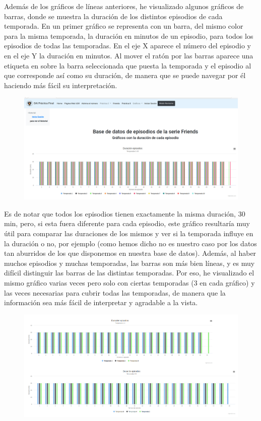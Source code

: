 \documentclass[12pt]{article}
\begin{document}
 Además de los gráficos de líneas anteriores, he visualizado algunos gráficos de barras, donde se muestra la duración de los distintos episodios de cada temporada. En un primer gráfico se representa con un barra, del mismo color para la misma temporada, la duración en minutos de un episodio, para todos los episodios de todas las temporadas. En el eje X aparece el número del episodio y en el eje Y la duración en minutos. Al mover el ratón por las barras aparece una etiqueta en sobre la barra seleccionada que puesta la temporada y el episodio al que corresponde así como su duración, de manera que se puede navegar por él haciendo más fácil su interpretación. 
 \begin{figure}[H]
 	\centering
 	\includegraphics[width=1.1\linewidth]{captura3}
 	\caption{}
 	\label{fig:captura3}
 \end{figure}
 
 Es de notar que todos los episodios tienen exactamente la misma duración, 30 min, pero, si esta fuera diferente para cada episodio, este gráfico resultaría muy útil para comparar las duraciones de los mismos y ver si la temporada influye en la duración o no, por ejemplo (como hemos dicho no es nuestro caso por los datos tan aburridos de los que disponemos en nuestra base de datos). Además, al haber muchos episodios y muchas temporadas, las barras son más bien líneas, y es muy difícil distinguir las barras de las distintas temporadas. Por eso, he visualizado el mismo gráfico varias veces pero solo con ciertas temporadas (3 en cada gráfico) y las veces necesarias para cubrir todas las temporadas, de manera que la información sea más fácil de interpretar y agradable a la vista. 
 
 \begin{figure}[H]
 	\centering
 	\includegraphics[width=1.1\linewidth]{captura4}
 	\caption{}
 	\label{fig:captura4}
 \end{figure}
 
\end{document}
